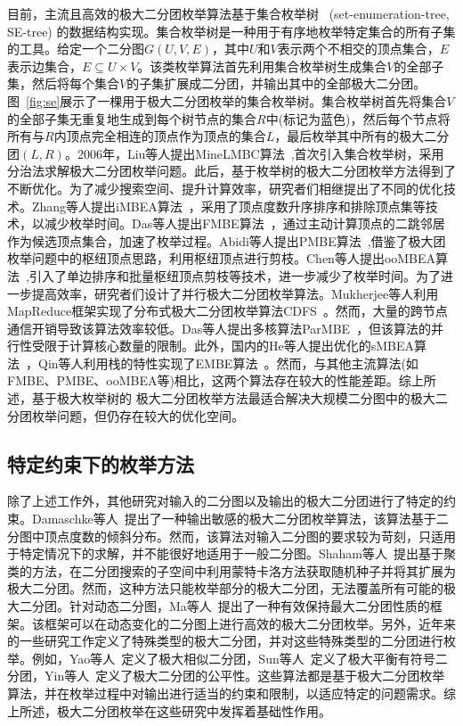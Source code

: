 目前，主流且高效的极大二分团枚举算法基于集合枚举树~\cite{SEtree92} (set-enumeration-tree, SE-tree) 的数据结构实现。集合枚举树是一种用于有序地枚举特定集合的所有子集的工具。给定一个二分图$G(U, V, E)$，其中$U$和$V$表示两个不相交的顶点集合，$E$表示边集合，$E \subseteq U \times V$。该类枚举算法首先利用集合枚举树生成集合$V$的全部子集，然后将每个集合$V$的子集扩展成二分团，并输出其中的全部极大二分团。图~\ref{fig:se}展示了一棵用于极大二分团枚举的集合枚举树。集合枚举树首先将集合$V$的全部子集无重复地生成到每个树节点的集合$R$中(标记为蓝色)，然后每个节点将所有与$R$内顶点完全相连的顶点作为顶点的集合$L$，最后枚举其中所有的极大二分团$(L,R)$。2006年，Liu等人提出MineLMBC算法~\cite{minel06},首次引入集合枚举树，采用分治法求解极大二分团枚举问题。此后，基于枚举树的极大二分团枚举方法得到了不断优化。为了减少搜索空间、提升计算效率，研究者们相继提出了不同的优化技术。Zhang等人提出iMBEA算法~\cite{iMBEA14}，采用了顶点度数升序排序和排除顶点集等技术，以减少枚举时间。Das等人提出FMBE算法~\cite{parMBE18}，通过主动计算顶点的二跳邻居作为候选顶点集合，加速了枚举过程。Abidi等人提出PMBE算法~\cite{PMBE20},借鉴了极大团枚举问题中的枢纽顶点思路，利用枢纽顶点进行剪枝。Chen等人提出ooMBEA算法~\cite{ooMBE22},引入了单边排序和批量枢纽顶点剪枝等技术，进一步减少了枚举时间。为了进一步提高效率，研究者们设计了并行极大二分团枚举算法。Mukherjee等人利用MapReduce框架实现了分布式极大二分团枚举算法CDFS~\cite{mapreduceMBE16}。然而，大量的跨节点通信开销导致该算法效率较低。Das等人提出多核算法ParMBE~\cite{parMBE18}，但该算法的并行性受限于计算核心数量的限制。此外，国内的He等人提出优化的sMBEA算法~\cite{MBEHe18}，Qin等人利用栈的特性实现了EMBE算法~\cite{MBEQin20}。然而，与其他主流算法(如FMBE、PMBE、ooMBEA等)相比，这两个算法存在较大的性能差距。综上所述，基于极大枚举树的
极大二分团枚举方法最适合解决大规模二分图中的极大二分团枚举问题，但仍存在较大的优化空间。

\subsection{特定约束下的枚举方法}

除了上述工作外，其他研究对输入的二分图以及输出的极大二分团进行了特定的约束。Damaschke等人~\cite{Damaschke14}提出了一种输出敏感的极大二分团枚举算法，该算法基于二分图中顶点度数的倾斜分布。然而，该算法对输入二分图的要求较为苛刻，只适用于特定情况下的求解，并不能很好地适用于一般二分图。Shaham等人~\cite{Shaham16}提出基于聚类的方法，在二分团搜索的子空间中利用蒙特卡洛方法获取随机种子并将其扩展为极大二分团。然而，这种方法只能枚举部分的极大二分团，无法覆盖所有可能的极大二分团。针对动态二分图，Ma等人~\cite{Ma22}提出了一种有效保持最大二分团性质的框架。该框架可以在动态变化的二分图上进行高效的极大二分团枚举。另外，近年来的一些研究工作定义了特殊类型的极大二分团，并对这些特殊类型的二分团进行枚举。例如，Yao等人~\cite{SimilarMBE22}定义了极大相似二分团，Sun等人~\cite{Sun22}定义了极大平衡有符号二分团，Yin等人~\cite{FairMBE23}定义了极大二分团的公平性。这些算法都是基于极大二分团枚举算法，并在枚举过程中对输出进行适当的约束和限制，以适应特定的问题需求。综上所述，极大二分团枚举在这些研究中发挥着基础性作用。


